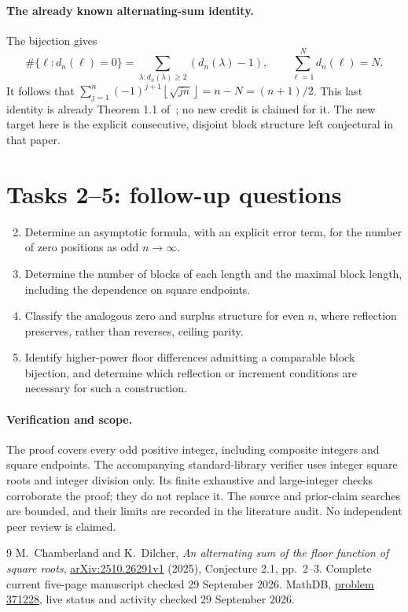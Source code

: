 \documentclass[11pt]{article}
\newcommand{\fl}[1]{\left\lfloor #1\right\rfloor}
\begin{document}
\paragraph{The already known alternating-sum identity.}
The bijection gives
\[
 \#\{\ell:d_n(\ell)=0\}
   =\sum_{\lambda:d_n(\lambda)\ge2}(d_n(\lambda)-1),
 \qquad \sum_{\ell=1}^{N}d_n(\ell)=N.
\]
It follows that $\sum_{j=1}^{n}(-1)^{j+1}\fl{\sqrt{jn}}=n-N=(n+1)/2$.
This last identity is already Theorem 1.1 of~\cite{CD}; no new credit
is claimed for it. The new target here is the explicit consecutive,
disjoint block structure left conjectural in that paper.

\section*{Tasks 2--5: follow-up questions}
\begin{enumerate}\setcounter{enumi}{1}
\item Determine an asymptotic formula, with an explicit error term,
for the number of zero positions as odd $n\to\infty$.
\item Determine the number of blocks of each length and the maximal
block length, including the dependence on square endpoints.
\item Classify the analogous zero and surplus structure for even $n$,
where reflection preserves, rather than reverses, ceiling parity.
\item Identify higher-power floor differences admitting a comparable
block bijection, and determine which reflection or increment conditions
are necessary for such a construction.
\end{enumerate}

\paragraph{Verification and scope.}
The proof covers every odd positive integer, including composite integers
and square endpoints. The accompanying standard-library verifier uses
integer square roots and integer division only. Its finite exhaustive
and large-integer checks corroborate the proof; they do not replace it.
The source and prior-claim searches are bounded, and their limits are
recorded in the literature audit. No independent peer review is claimed.

\begin{thebibliography}{9}
 M.~Chamberland and K.~Dilcher,
\emph{An alternating sum of the floor function of square roots},
\href{https://arxiv.org/abs/2510.26291}{arXiv:2510.26291v1} (2025),
Conjecture 2.1, pp.~2--3. Complete current five-page manuscript checked
29 September 2026.
 MathDB,
\href{https://mathdb.com/p/371228}{problem 371228},
live status and activity checked 29 September 2026.
\end{thebibliography}
\end{document}
